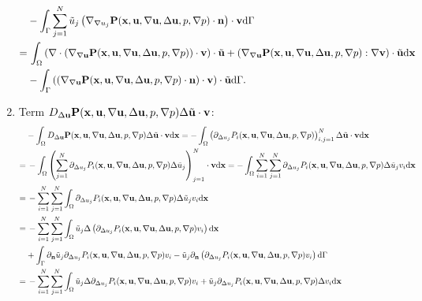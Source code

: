 \documentclass[oneside,11pt]{book}
\numberwithin{equation}{section}
\begin{document}
\begin{enumerate}[leftmargin=0in]
\begin{align*}
        &- \int_\Gamma \sum_{j=1}^N \tilde{u}_j\left(\nabla_{\nabla u_j}{\bf P}({\bf x},{\bf u},\nabla{\bf u},\Delta{\bf u},p,\nabla p)\cdot{\bf n}\right)\cdot{\bf v}{\rm d}\Gamma\\
        =&\, \int_\Omega \left(\nabla\cdot\left(\nabla_{\nabla{\bf u}}{\bf P}({\bf x},{\bf u},\nabla{\bf u},\Delta{\bf u},p,\nabla p)\right)\cdot{\bf v}\right)\cdot\tilde{\bf u} + \left(\nabla_{\nabla{\bf u}}{\bf P}({\bf x},{\bf u},\nabla{\bf u},\Delta{\bf u},p,\nabla p):\nabla{\bf v}\right)\cdot\tilde{\bf u}{\rm d}{\bf x}\\
        &- \int_\Gamma \left(\left(\nabla_{\nabla{\bf u}}{\bf P}({\bf x},{\bf u},\nabla{\bf u},\Delta{\bf u},p,\nabla p)\cdot{\bf n}\right)\cdot{\bf v}\right)\cdot\tilde{\bf u}{\rm d}\Gamma.
    \end{align*}
    \item Term $D_{\Delta{\bf u}}{\bf P}({\bf x},{\bf u},\nabla{\bf u},\Delta{\bf u},p,\nabla p)\Delta\tilde{\bf u}\cdot{\bf v}$:
    \begin{align*}
        &-\int_\Omega D_{\Delta{\bf u}}{\bf P}({\bf x},{\bf u},\nabla{\bf u},\Delta{\bf u},p,\nabla p)\Delta\tilde{\bf u}\cdot{\bf v}{\rm d}{\bf x} = -\int_\Omega \left(\partial_{\Delta u_j}P_i({\bf x},{\bf u},\nabla{\bf u},\Delta{\bf u},p,\nabla p)\right)_{i,j=1}^N\Delta\tilde{\bf u}\cdot{\bf v}{\rm d}{\bf x}\\
        =&\, -\int_\Omega \left(\sum_{j=1}^N \partial_{\Delta u_j}P_i({\bf x},{\bf u},\nabla{\bf u},\Delta{\bf u},p,\nabla p)\Delta\tilde{u}_j\right)_{j=1}^N\cdot{\bf v}{\rm d}{\bf x} = -\int_\Omega \sum_{i=1}^N\sum_{j=1}^N \partial_{\Delta u_j}P_i({\bf x},{\bf u},\nabla{\bf u},\Delta{\bf u},p,\nabla p)\Delta\tilde{u}_jv_i{\rm d}{\bf x}\\
        =&\, -\sum_{i=1}^N\sum_{j=1}^N \int_\Omega \partial_{\Delta u_j}P_i({\bf x},{\bf u},\nabla{\bf u},\Delta{\bf u},p,\nabla p)\Delta\tilde{u}_jv_i{\rm d}{\bf x}\\
        =&\, -\sum_{i=1}^N\sum_{j=1}^N \int_\Omega \tilde{u}_j\Delta\left(\partial_{\Delta u_j}P_i({\bf x},{\bf u},\nabla{\bf u},\Delta{\bf u},p,\nabla p)v_i\right){\rm d}{\bf x}\\
        &+ \int_\Gamma \partial_{\bf n}\tilde{u}_j\partial_{\Delta u_j}P_i({\bf x},{\bf u},\nabla{\bf u},\Delta{\bf u},p,\nabla p)v_i - \tilde{u}_j\partial_{\bf n}\left(\partial_{\Delta u_j}P_i({\bf x},{\bf u},\nabla{\bf u},\Delta{\bf u},p,\nabla p)v_i\right){\rm d}\Gamma\\
        =&\, -\sum_{i=1}^N\sum_{j=1}^N \int_\Omega \tilde{u}_j\Delta\partial_{\Delta u_j}P_i({\bf x},{\bf u},\nabla{\bf u},\Delta{\bf u},p,\nabla p)v_i + \tilde{u}_j\partial_{\Delta u_j}P_i({\bf x},{\bf u},\nabla{\bf u},\Delta{\bf u},p,\nabla p)\Delta v_i{\rm d}{\bf x}\\

\end{align*}
\end{enumerate}
\end{document}
